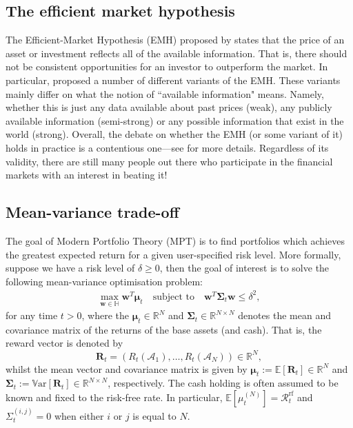 \documentclass[12pt]{article}
\begin{document}
\subsection{The efficient market hypothesis}
The Efficient-Market Hypothesis (EMH) proposed by \cite{fama1970jf} states that the price of an asset or investment reflects all of the available information. That is, there should not be consistent opportunities for an investor to outperform the market. In particular, \cite{fama1970jf} proposed a number of different variants of the EMH. These variants mainly differ on what the notion of ``available information" means. Namely, whether this is just any data available about past prices (weak), any publicly available information (semi-strong) or any possible information that exist in the world (strong). Overall, the debate on whether the EMH (or some variant of it) holds in practice is a contentious one---see \cite{malkiel2003jep} for more details. Regardless of its validity, there are still many people out there who participate in the financial markets with an interest in beating it!
\subsection{Mean-variance trade-off}
\label{sec:mean_variance}
The goal of Modern Portfolio Theory (MPT) \citep{markowitz1952jf} is to find portfolios which achieves the greatest expected return for a given user-specified risk level. More formally, suppose we have a risk level of $\delta \geq 0$, then the goal of interest is to solve the following mean-variance optimisation problem:
\begin{align}
	\max_{\mathbf{w} \in \mathbb{H}} \mathbf{w}^T \boldsymbol{\mu}_t
	\quad
	\text{subject to}
	\quad 
	\mathbf{w}^T\boldsymbol{\Sigma}_t \mathbf{w} \leq \delta^2,
	\label{eqn:mean_variance_problem}
\end{align}
for any time $t > 0$, where the $\boldsymbol{\mu}_t \in \mathbb{R}^N$ and $\boldsymbol{\Sigma}_t \in \mathbb{R}^{N \times N}$ denotes the mean and covariance matrix of the returns of the base assets (and cash). That is, the reward vector is denoted by
\begin{equation}
	\mathbf{R}_t = (R_t(\mathcal{A}_1), \dots, R_t(\mathcal{A}_N)) \in \mathbb{R}^N,
\end{equation}
whilst the mean vector and covariance matrix is given by $\boldsymbol{\mu}_t := \mathbb{E}[\mathbf{R}_t] \in \mathbb{R}^N$ and $\boldsymbol{\Sigma}_t := \mathbb{V}\text{ar}[\mathbf{R}_t] \in \mathbb{R}^{N \times N}$, respectively. The cash holding is often assumed to be known and fixed to the risk-free rate. In particular, $\mathbb{E}[\mu_t^{(N)}] = \mathcal{R}_t^{\text{rf}}$ and $\Sigma_t^{(i, j)} = 0$ when either $i$ or $j$ is equal to $N$.
\end{document}
